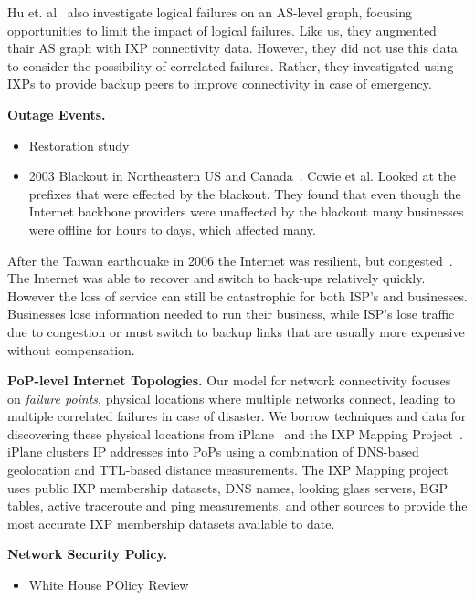     Hu et. al~\cite{ixp-routingdiversity} also investigate logical failures on an AS-level graph, focusing opportunities to limit the impact of logical failures.
    Like us, they augmented thair AS graph with IXP connectivity data.
    However, they did not use this data to consider the possibility of correlated failures.
    Rather, they investigated using IXPs to provide backup peers to improve connectivity in case of emergency. 

{\bf Outage Events.}
\begin{itemize}
    \item Restoration study~\cite{taiwan}

    \item 2003 Blackout in Northeastern US and Canada~\cite{blackout2003}. Cowie
    et al. Looked at the prefixes that were effected by the blackout. They found
    that even though the Internet backbone providers were unaffected by the
    blackout many businesses were offline for hours to days, which affected many.
\end{itemize}

    After the Taiwan earthquake in 2006 the Internet was resilient, but
    congested~\cite{asia-comm-quake}. The Internet was able to recover and
    switch to back-ups relatively quickly. However the loss of service can still
    be catastrophic for both ISP's and businesses. Businesses lose information
    needed to run their business, while ISP's lose traffic due to congestion or
    must switch to backup links that are usually more expensive without
    compensation.

{\bf PoP-level Internet Topologies.}
    Our model for network connectivity focuses on {\it failure points}, physical locations where multiple networks connect, leading to multiple correlated failures in case of disaster.
    We borrow techniques and data for discovering these physical locations from iPlane~\cite{iplane} and the IXP Mapping Project~\cite{ixps-mapped}.
    iPlane clusters IP addresses into PoPs using a combination of DNS-based geolocation and TTL-based distance measurements.
    The IXP Mapping project uses public IXP membership datasets, DNS names, looking glass servers, BGP tables, active traceroute and ping measurements, and other sources to provide the most accurate IXP membership datasets available to date. 

{\bf Network Security Policy.}
    \begin{itemize}
        \item White House POlicy Review~\cite{cyberspacepolicy} 
    \end{itemize}
